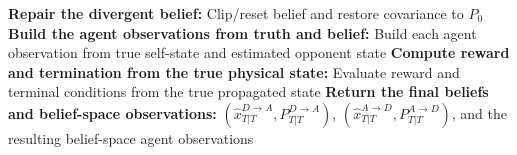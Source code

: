 \begin{algorithm}[H]
\begin{algorithmic}[1]
      \State \textbf{Repair the divergent belief:}
      \State \hspace{1em} Clip/reset belief and restore covariance to $P_0$
    \EndIf
  \EndFor
  \State \textbf{Build the agent observations from truth and belief:}
  \State \hspace{1em} Build each agent observation from true self-state and estimated opponent state
  \State \textbf{Compute reward and termination from the true physical state:}
  \State \hspace{1em} Evaluate reward and terminal conditions from the true propagated state
\EndFor
\State \textbf{Return the final beliefs and belief-space observations:}
\State \hspace{1em} $(\hat{x}^{D\to A}_{T|T},P^{D\to A}_{T|T})$, $(\hat{x}^{A\to D}_{T|T},P^{A\to D}_{T|T})$, and the resulting belief-space agent observations
\end{algorithmic}
\end{algorithm}
